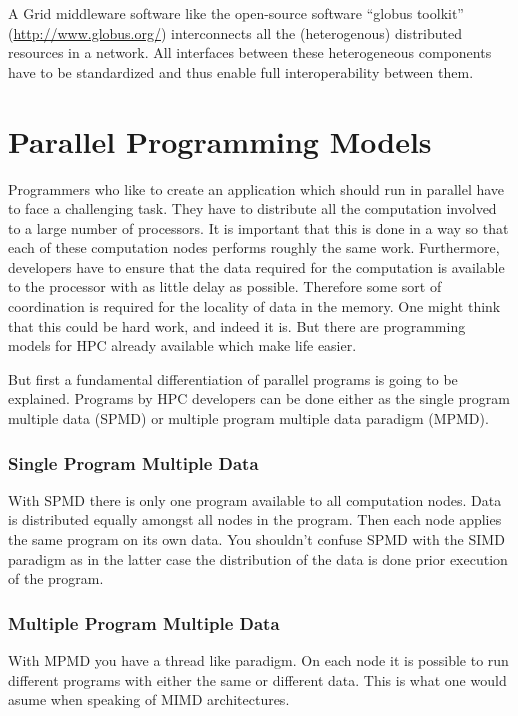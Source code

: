 A Grid middleware software like the open-source software ``globus
toolkit'' (\url{http://www.globus.org/}) interconnects all the (heterogenous)
distributed resources in a network.  
All interfaces between these heterogeneous components have to be standardized
and thus enable full interoperability between them.

\section{Parallel Programming Models}
\label{sec:programming_models}

Programmers who like to create an application which should run in
parallel have to face a challenging task. They have to distribute all
the computation involved to a large number of processors. It is
important that this is done in a way so that each of these computation
nodes performs roughly the same work. Furthermore, developers have to
ensure that the data required for the computation is available to the
processor with as little delay as possible. Therefore some sort of
coordination is required for the locality of data in the memory.
One might think that this could be hard work, and indeed it is. But
there are programming models for HPC already available which make life
easier.

But first a fundamental differentiation of parallel programs is going
to be explained. Programs by HPC developers can be done either
as the single program multiple data (SPMD) or multiple program
multiple data paradigm (MPMD).

\subsubsection{Single Program Multiple Data}

With SPMD there is only one program available
to all computation nodes. Data is distributed equally amongst all
nodes in the program. Then each node applies the same program on its
own data. You shouldn't confuse SPMD with the SIMD paradigm as in the
latter case the
distribution of the data is done prior execution of the program.

\subsubsection{Multiple Program Multiple Data}

With MPMD you have a thread like paradigm. On each node it is possible
to run different programs with either the same or different data. This
is what one would asume when speaking of MIMD architectures.  

